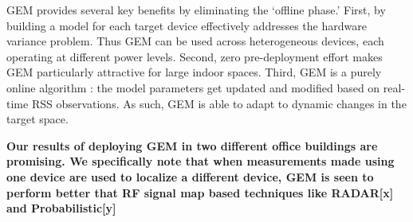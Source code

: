 GEM provides several key benefits by eliminating the `offline phase.' First, by building a model for each target device effectively addresses the hardware variance problem. Thus GEM can be used across heterogeneous devices, each operating at different power levels.  Second, zero pre-deployment effort makes GEM particularly attractive for large indoor spaces. Third, GEM is a purely online algorithm : the model parameters get updated and modified based on real-time RSS observations. As such, GEM is able to adapt to dynamic changes in the target space.

\textbf{Our results of deploying GEM in two different office buildings are promising. We specifically note that when measurements made using one device are used to localize a different device,  GEM is seen to perform better that RF signal map based techniques like RADAR[x] and Probabilistic[y]
}